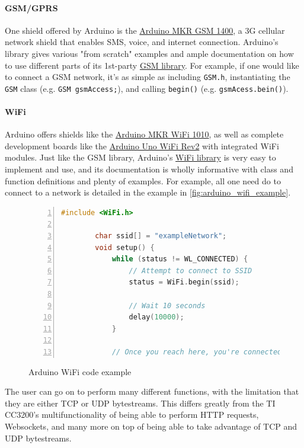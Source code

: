 \paragraph{GSM/GPRS} One shield offered by Arduino is the \href{https://store.arduino.cc/products/arduino-mkr-gsm-1400}{Arduino MKR GSM 1400}, a 3G cellular network shield that enables SMS, voice, and internet connection. Arduino's library gives various "from scratch" examples and ample documentation on how to use different parts of its 1st-party \href{https://docs.arduino.cc/retired/archived-libraries/GSM}{GSM library}. For example, if one would like to connect a GSM network, it's as simple as including \texttt{GSM.h}, instantiating the \texttt{GSM} class (e.g. \texttt{GSM gsmAccess;}), and calling \texttt{begin()} (e.g. \texttt{gsmAcess.bein()}).

\paragraph{WiFi} Arduino offers shields like the \href{https://store.arduino.cc/products/arduino-mkr-wifi-1010}{Arduino MKR WiFi 1010}, as well as complete development boards like the \href{https://store.arduino.cc/products/arduino-uno-wifi-rev2}{Arduino Uno WiFi Rev2} with integrated WiFi modules. Just like the GSM library, Arduino's \href{https://www.arduino.cc/reference/en/libraries/wifi/}{WiFi library} is very easy to implement and use, and its documentation is wholly informative with class and function definitions and plenty of examples. For example, all one need do to connect to a network is detailed in the example in \autoref{fig:arduino_wifi_example}.

\begin{figure}[hbtp]
    \caption{Arduino WiFi code example}
    \label{fig:arduino_wifi_example}
    \begin{lstlisting}[language=c,frame=none,numbers=left,numbersep=-10pt,numberstyle=\tiny,basicstyle=\footnotesize\ttfamily]
        #include <WiFi.h>

        char ssid[] = "exampleNetwork";
        void setup() {
            while (status != WL_CONNECTED) {
                // Attempt to connect to SSID
                status = WiFi.begin(ssid);

                // Wait 10 seconds
                delay(10000);
            }

            // Once you reach here, you're connected
    \end{lstlisting}
\end{figure}

The user can go on to perform many different functions, with the limitation that they are either TCP or UDP bytestreams. This differs greatly from the TI CC3200's multifunctionality of being able to perform HTTP requests, Websockets, and many more on top of being able to take advantage of TCP and UDP bytestreams.